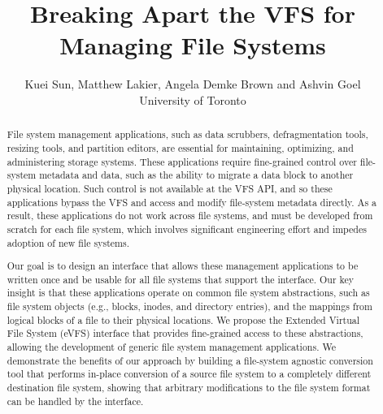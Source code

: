 \documentclass[letterpaper,twocolumn,10pt]{article}
\date{}
\begin{document}
\title{\Large \bf Breaking Apart the VFS for Managing File Systems}
\author{
  {\rm Kuei Sun, Matthew Lakier, Angela Demke Brown and Ashvin Goel}\\
  University of Toronto
} %

\maketitle

\begin{abstract}
File system management applications, such as data scrubbers, defragmentation tools, resizing tools, and partition editors, are essential for maintaining, optimizing, and administering storage systems. These applications require fine-grained control over file-system metadata and data, such as the ability to migrate a data block to another physical location. Such control is not available at the VFS API, and so these applications bypass the VFS and access and modify file-system metadata directly. As a result, these applications do not work across file systems, and must be developed from scratch for each file system, which involves significant engineering effort and impedes adoption of new file systems.

Our goal is to design an interface that allows these management applications to be written once and be usable for all file systems that support the interface. Our key insight is that these applications operate on common file system abstractions, such as file system objects (e.g., blocks, inodes, and directory entries), and the mappings from logical blocks of a file to their physical locations. We propose the Extended Virtual File System (eVFS) interface that provides fine-grained access to these abstractions, allowing the development of generic file system management applications. We demonstrate the benefits of our approach by building a file-system agnostic conversion tool that performs in-place conversion of a source file system to a completely different destination file system, showing that arbitrary modifications to the file system format can be handled by the interface.

\end{abstract}








\end{document}
